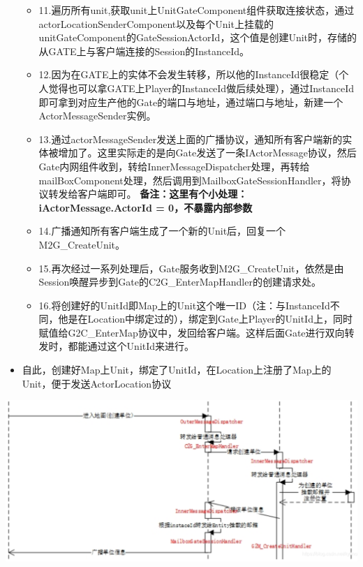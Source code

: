 \documentclass[9pt, b5paper]{article}
\begin{document}
\begin{itemize}
\begin{itemize}
\item 11.遍历所有unit,获取unit上UnitGateComponent组件获取连接状态，通过actorLocationSenderComponent以及每个Unit上挂载的unitGateComponent的GateSessionActorId，这个值是创建Unit时，存储的从GATE上与客户端连接的Session的InstanceId。
\item 12.因为在GATE上的实体不会发生转移，所以他的InstanceId很稳定（个人觉得也可以拿GATE上Player的InstanceId做后续处理），通过InstanceId即可拿到对应生产他的Gate的端口与地址，通过端口与地址，新建一个ActorMessageSender实例。
\item 13.通过actorMessageSender发送上面的广播协议，通知所有客户端新的实体被增加了。这里实际走的是向Gate发送了一条IActorMessage协议，然后Gate内网组件收到，转给InnerMessageDispatcher处理，再转给mailBoxComponent处理，然后调用到MailboxGateSessionHandler，将协议转发给客户端即可。 \textbf{备注：这里有个小处理：iActorMessage.ActorId = 0，不暴露内部参数}
\item 14.广播通知所有客户端生成了一个新的Unit后，回复一个M2G\_CreateUnit。
\item 15.再次经过一系列处理后，Gate服务收到M2G\_CreateUnit，依然是由Session唤醒异步到Gate的C2G\_EnterMapHandler的创建请求处。
\item 16.将创建好的UnitId即Map上的Unit这个唯一ID（注：与InstanceId不同，他是在Location中绑定过的），绑定到Gate上Player的UnitId上，同时赋值给G2C\_EnterMap协议中，发回给客户端。这样后面Gate进行双向转发时，都能通过这个UnitId来进行。
\end{itemize}
\item 自此，创建好Map上Unit，绑定了UnitId，在Location上注册了Map上的Unit，便于发送ActorLocation协议
\end{itemize}

\includegraphics[width=.9\linewidth]{./pic/readme_20230219_103732.png}
\end{document}
